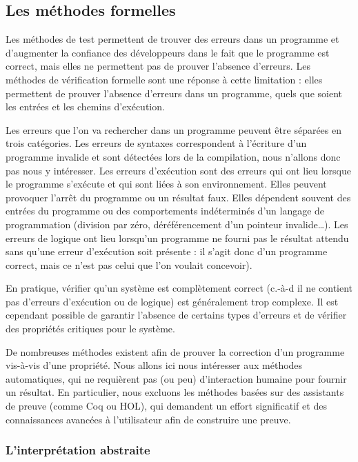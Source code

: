 \subsection{Les méthodes formelles}

Les méthodes de test permettent de trouver des erreurs dans un programme
et d'augmenter la confiance des développeurs dans le fait que le
programme est correct, mais elles ne permettent pas de prouver l'absence
d'erreurs.
Les méthodes de vérification formelle sont une réponse à cette limitation :
elles permettent de prouver l'absence d'erreurs dans un programme,
quels que soient les entrées et les chemins d'exécution.

Les erreurs que l'on va rechercher dans un programme peuvent être séparées en
trois catégories. Les erreurs de syntaxes correspondent à l'écriture d'un
programme invalide et sont détectées lors de la compilation, nous n'allons donc
pas nous y intéresser. Les erreurs d'exécution sont des erreurs qui ont lieu
lorsque le programme s'exécute et qui sont liées à son environnement. Elles
peuvent provoquer l'arrêt du programme ou un résultat faux. Elles dépendent souvent
des entrées du programme ou des comportements indéterminés d'un langage de
programmation (division par zéro, déréférencement d'un pointeur invalide\dots).
Les erreurs de logique ont lieu lorsqu'un programme ne fourni pas le résultat
attendu sans qu'une erreur d'exécution soit présente : il s'agit donc d'un
programme correct, mais ce n'est pas celui que l'on voulait concevoir).

En pratique, vérifier qu'un système est complètement correct (c.-à-d il ne
contient pas d'erreurs d'exécution ou de logique) est généralement trop
complexe. Il est cependant possible de garantir l'absence de certains types
d'erreurs et de vérifier des propriétés critiques pour le système.

De nombreuses méthodes existent afin de prouver la correction d'un
programme vis-à-vis d'une propriété. Nous allons ici nous intéresser aux
méthodes automatiques, qui ne requièrent pas (ou peu) d'interaction
humaine pour fournir un résultat. En particulier, nous excluons les
méthodes basées sur des assistants de preuve (comme Coq ou HOL), qui
demandent un effort significatif et des connaissances avancées à
l'utilisateur afin de construire une preuve.

\subsubsection{L'interprétation abstraite}

